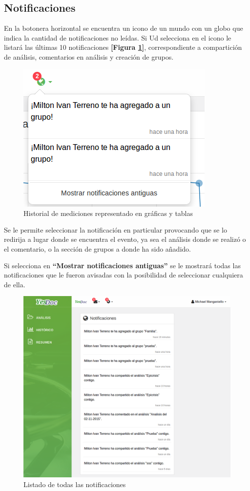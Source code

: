 \subsection{Notificaciones}
En la botonera horizontal se encuentra un icono de un mundo con un globo que indica la cantidad de notificaciones no leídas. Si Ud selecciona en el icono le listará las últimas 10 notificaciones \textbf{[Figura \ref{mu-notificaciones_vista_previa}]}, correspondiente a compartición de análisis, comentarios en análisis y creación de grupos. 
\begin{figure}
	\centering
	\includegraphics[width=.8\textwidth]{img/manual_de_usuario/notificaciones_vista_previa}
	\caption{Historial de mediciones representado en gráficas y tablas}
	\label{mu-notificaciones_vista_previa}
\end{figure}
Se le permite seleccionar la notificación en particular provocando que se lo redirija a lugar donde se encuentra el evento, ya sea el análisis donde se realizó o el comentario, o la sección de grupos a donde ha sido añadido.

Si selecciona en \textbf{``Mostrar notificaciones antiguas''} se le mostrará todas las notificaciones que le fueron avisadas con la posibilidad de seleccionar cualquiera de ella.

\begin{figure}
	\centering
	\includegraphics[width=.8\textwidth]{img/manual_de_usuario/lista_notificaciones}
	\caption{Listado de todas las notificaciones}
	\label{mu-lista_notificaciones}
\end{figure}

